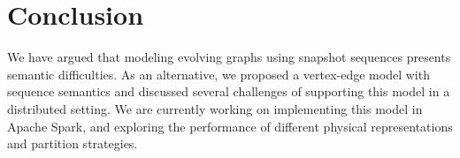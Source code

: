 \section{Conclusion}
\label{sec:conc}

We have argued that modeling evolving graphs using snapshot sequences
presents semantic difficulties.  As an alternative, we proposed a
vertex-edge model with sequence semantics and discussed several
challenges of supporting this model in a distributed setting.  We are
currently working on implementing this model in Apache Spark, and
exploring the performance of different physical representations and
partition strategies.

